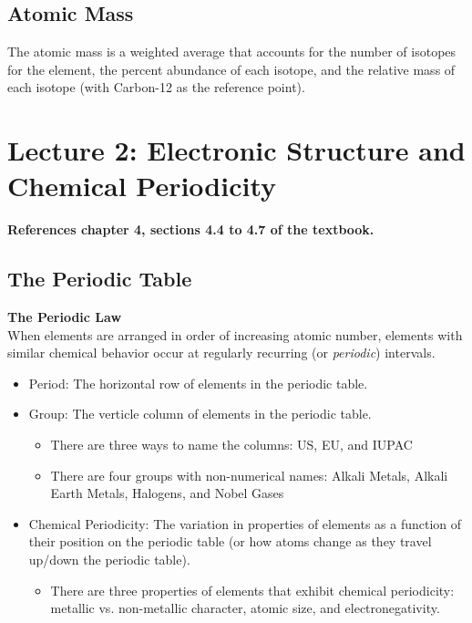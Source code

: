 \subsection{Atomic Mass}

\begin{defn}
The atomic mass is a weighted average that accounts for the number of isotopes for the element, the percent abundance of each isotope, and the relative mass of each isotope (with Carbon-12 as the reference point).
\end{defn}

\section{Lecture 2: Electronic Structure and Chemical Periodicity}

\textbf{References chapter 4, sections 4.4 to 4.7 of the textbook.}

\subsection{The Periodic Table}

\begin{defn}
\textbf{The Periodic Law} \\

\noindent
When elements are arranged in order of increasing atomic number, elements with similar chemical behavior occur at regularly recurring (or \textit{periodic}) intervals.
\end{defn}

\begin{itemize}
\item Period: The horizontal row of elements in the periodic table.
\item Group: The verticle column of elements in the periodic table.
	\begin{itemize}
	\item There are three ways to name the columns: US, EU, and IUPAC
	\item There are four groups with non-numerical names: Alkali Metals, Alkali Earth Metals, Halogens, and Nobel Gases
	\end{itemize}
\item Chemical Periodicity: The variation in properties of elements as a function of their position on the periodic table (or how atoms change as they travel up/down the periodic table).
	\begin{itemize}
	\item There are three properties of elements that exhibit chemical periodicity: metallic vs. non-metallic character, atomic size, and electronegativity.
	\end{itemize}
\end{itemize}


